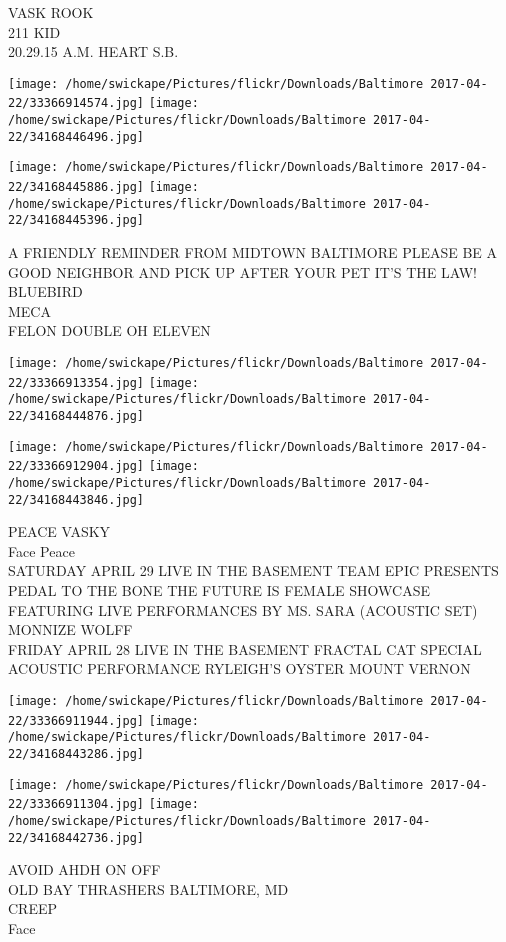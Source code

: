 \documentclass[10pt,letterpaper]{article}
\begin{document}
VASK ROOK\\
211 KID\\
20.29.15 A.M. HEART S.B.
\pagebreak

\texttt{[image: /home/swickape/Pictures/flickr/Downloads/Baltimore 2017-04-22/33366914574.jpg]}
\texttt{[image: /home/swickape/Pictures/flickr/Downloads/Baltimore 2017-04-22/34168446496.jpg]}

\texttt{[image: /home/swickape/Pictures/flickr/Downloads/Baltimore 2017-04-22/34168445886.jpg]}
\texttt{[image: /home/swickape/Pictures/flickr/Downloads/Baltimore 2017-04-22/34168445396.jpg]}

A FRIENDLY REMINDER FROM MIDTOWN BALTIMORE PLEASE BE A GOOD NEIGHBOR AND PICK UP AFTER YOUR PET IT'S THE LAW!\\
BLUEBIRD\\
MECA\\
FELON DOUBLE OH ELEVEN
\pagebreak

\texttt{[image: /home/swickape/Pictures/flickr/Downloads/Baltimore 2017-04-22/33366913354.jpg]}
\texttt{[image: /home/swickape/Pictures/flickr/Downloads/Baltimore 2017-04-22/34168444876.jpg]}

\texttt{[image: /home/swickape/Pictures/flickr/Downloads/Baltimore 2017-04-22/33366912904.jpg]}
\texttt{[image: /home/swickape/Pictures/flickr/Downloads/Baltimore 2017-04-22/34168443846.jpg]}

PEACE VASKY\\
Face Peace\\
SATURDAY APRIL 29 LIVE IN THE BASEMENT TEAM EPIC PRESENTS PEDAL TO THE BONE THE FUTURE IS FEMALE SHOWCASE FEATURING LIVE PERFORMANCES BY MS. SARA (ACOUSTIC SET)  MONNIZE WOLFF\\
FRIDAY APRIL 28 LIVE IN THE BASEMENT FRACTAL CAT SPECIAL ACOUSTIC PERFORMANCE RYLEIGH'S OYSTER MOUNT VERNON
\pagebreak

\texttt{[image: /home/swickape/Pictures/flickr/Downloads/Baltimore 2017-04-22/33366911944.jpg]}
\texttt{[image: /home/swickape/Pictures/flickr/Downloads/Baltimore 2017-04-22/34168443286.jpg]}

\texttt{[image: /home/swickape/Pictures/flickr/Downloads/Baltimore 2017-04-22/33366911304.jpg]}
\texttt{[image: /home/swickape/Pictures/flickr/Downloads/Baltimore 2017-04-22/34168442736.jpg]}

AVOID AHDH ON OFF\\
OLD BAY THRASHERS BALTIMORE, MD\\
CREEP\\
Face
\pagebreak
\end{document}
